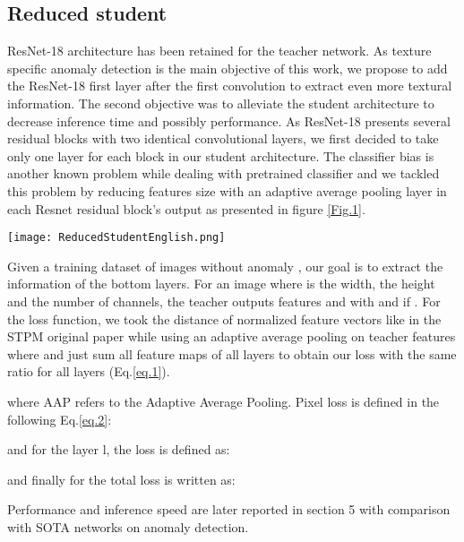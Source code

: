 \documentclass[a4paper,twoside]{article}
\begin{document}
\subsection{Reduced student} 
 ResNet-18 architecture has been retained for the teacher network. As  texture specific anomaly detection is the main objective of this work, we propose to add the ResNet-18 first layer after the first convolution to extract even more textural information. The second objective was to alleviate the student architecture to decrease inference time and possibly performance. As ResNet-18 presents several residual blocks with two identical convolutional layers, we first decided to take only one layer for each block in our student architecture. The classifier bias is another known problem while dealing with pretrained classifier and we tackled this problem by reducing features size with an adaptive average pooling layer in each Resnet residual block's output as presented in figure \ref{Fig.1}.\\
\begin{figure*}[b]
\centerline{\texttt{[image: ReducedStudentEnglish.png]}}
\renewcommand{\arraystretch}{1}
\caption{ 
Reduced student architecture with AP for adaptive average pooling. }
\label{Fig.1}
\end{figure*}


\noindent Given a training dataset of images without anomaly , our goal is to extract the information of the  bottom layers. For an image  where  is the width,  the height and  the number of channels, the teacher outputs features  and  with  and  if . For the loss function, we took the  distance of normalized feature vectors like in the STPM original paper \citep{wang_student-teacher_2021} while using an adaptive average pooling on teacher features where  and just sum all feature maps of all layers to obtain our loss with the same ratio for all layers (Eq.\ref{eq.1}). 




\noindent where AAP refers to the Adaptive Average Pooling. Pixel loss is defined in the following Eq.\ref{eq.2}: 



\noindent and for the layer l, the loss is defined as: 


\noindent  and finally for the total loss is written as: 



Performance and inference speed are later reported in section 5 with comparison with SOTA networks on anomaly detection.
\end{document}
